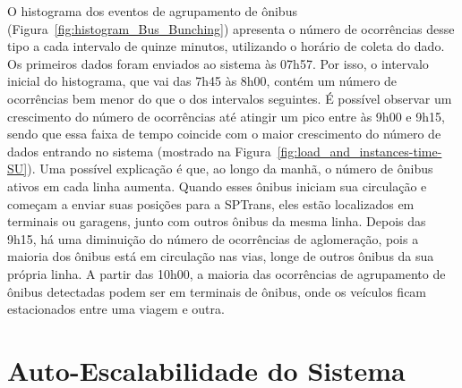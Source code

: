 


O histograma dos eventos de agrupamento de ônibus (Figura~\ref{fig:histogram_Bus_Bunching}) apresenta o número de ocorrências desse tipo a cada intervalo de quinze minutos, utilizando o horário de coleta do dado. Os primeiros dados foram enviados ao sistema às 07h57. Por isso, o  intervalo inicial do histograma, que vai das 7h45 às 8h00, contém um número de ocorrências bem menor do que o dos intervalos seguintes.
É possível observar um crescimento do número de ocorrências até atingir um pico entre às 9h00 e 9h15, sendo que essa faixa de tempo coincide com o maior crescimento do número de dados entrando no sistema (mostrado na Figura~\ref{fig:load_and_instances-time-SU}). Uma possível explicação é que, ao longo da manhã, o número de ônibus ativos em cada linha aumenta. Quando esses ônibus iniciam sua circulação e começam a enviar suas posições para a SPTrans, eles estão localizados em terminais ou garagens, junto com outros ônibus da mesma linha. Depois das 9h15, há uma diminuição do número de ocorrências de aglomeração, pois a maioria dos ônibus está em circulação nas vias, longe de outros ônibus da sua própria linha. A partir das 10h00, a maioria das ocorrências de agrupamento de ônibus detectadas podem ser em terminais de ônibus, onde os veículos ficam estacionados entre uma viagem e outra. 


\section{Auto-Escalabilidade do Sistema}
\label{sec:auto_scalability}



